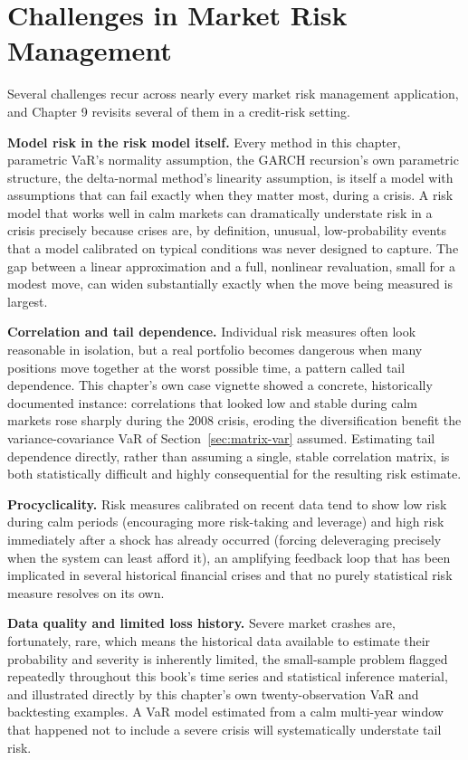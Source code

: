 \documentclass[../ai_in_finance]{subfiles}
\begin{document}
\section{Challenges in Market Risk Management}

Several challenges recur across nearly every market risk management application, and Chapter 9 revisits several of them in a credit-risk setting.

\textbf{Model risk in the risk model itself.} Every method in this chapter, parametric VaR's normality assumption, the GARCH recursion's own parametric structure, the delta-normal method's linearity assumption, is itself a model with assumptions that can fail exactly when they matter most, during a crisis. A risk model that works well in calm markets can dramatically understate risk in a crisis precisely because crises are, by definition, unusual, low-probability events that a model calibrated on typical conditions was never designed to capture.
The gap between a linear approximation and a full, nonlinear revaluation, small for a modest move, can widen substantially exactly when the move being measured is largest.

\textbf{Correlation and tail dependence.} Individual risk measures often look reasonable in isolation, but a real portfolio becomes dangerous when many positions move together at the worst possible time, a pattern called tail dependence.
This chapter's own case vignette showed a concrete, historically documented instance: correlations that looked low and stable during calm markets rose sharply during the 2008 crisis, eroding the diversification benefit the variance-covariance VaR of Section~\ref{sec:matrix-var} assumed. Estimating tail dependence directly, rather than assuming a single, stable correlation matrix, is both statistically difficult and highly consequential for the resulting risk estimate.

\textbf{Procyclicality.} Risk measures calibrated on recent data tend to show low risk during calm periods (encouraging more risk-taking and leverage) and high risk immediately after a shock has already occurred (forcing deleveraging precisely when the system can least afford it), an amplifying feedback loop that has been implicated in several historical financial crises and that no purely statistical risk measure resolves on its own.

\textbf{Data quality and limited loss history.} Severe market crashes are, fortunately, rare, which means the historical data available to estimate their probability and severity is inherently limited, the small-sample problem flagged repeatedly throughout this book's time series and statistical inference material, and illustrated directly by this chapter's own twenty-observation VaR and backtesting examples. A VaR model estimated from a calm multi-year window that happened not to include a severe crisis will systematically understate tail risk.
\end{document}
